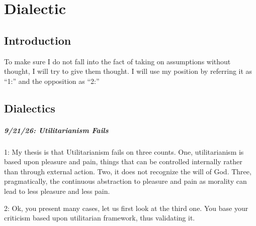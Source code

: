 \chapter{Dialectic}

\section{Introduction}
To make sure I do not fall into the fact of taking on assumptions without thought, I will try to give them thought. I will use my position by referring it as ``1:'' and the opposition as ``2:''
\section{Dialectics}

\paragraph{9/21/26: Utilitarianism Fails}
1: My thesis is that Utilitarianism fails on three counts. One, utilitarianism is based upon pleasure and pain, things that can be controlled internally rather than through external action. Two, it does not recognize the will of God. Three, pragmatically, the continuous abstraction to pleasure and pain as morality can lead to less pleasure and less pain.

2: Ok, you present many cases, let us first look at the third one. You base your criticism based upon utilitarian framework, thus validating it.
